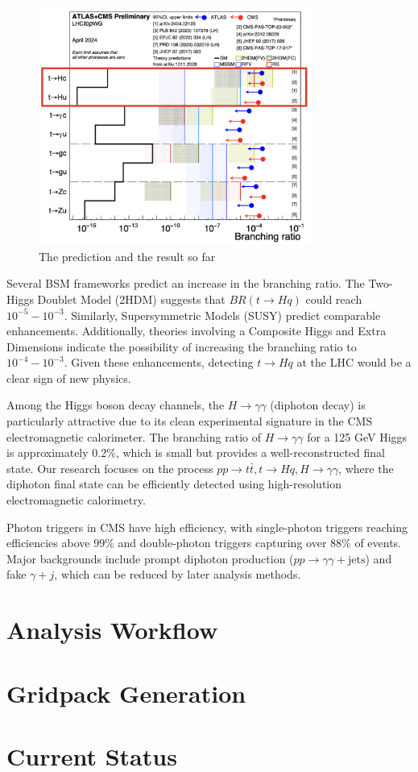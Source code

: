 \begin{figure}[htbp]
    \centering
    \includegraphics[width=0.8\textwidth]{Figures/topfcnc.png}
    \caption{The prediction and the result so far}
    \label{fig:TopFCNC}
\end{figure}

Several BSM frameworks predict an increase in the branching ratio. The Two-Higgs Doublet Model (2HDM) suggests that $BR(t \to Hq)$ could reach $10^{-5} - 10^{-3}$.\cite{noauthor_fcnchistory_nodate} Similarly, Supersymmetric Models (SUSY) predict comparable enhancements. Additionally, theories involving a Composite Higgs and Extra Dimensions indicate the possibility of increasing the branching ratio to $10^{-4} - 10^{-3}$. Given these enhancements, detecting $t \to Hq$ at the LHC would be a clear sign of new physics.

Among the Higgs boson decay channels, the $H \to \gamma\gamma$ (diphoton decay) is particularly attractive due to its clean experimental signature in the CMS electromagnetic calorimeter. The branching ratio of $H \to \gamma\gamma$ for a 125 GeV Higgs is approximately $0.2\%$, which is small but provides a well-reconstructed final state. Our research focuses on the process $pp \to t\bar{t}, t \to Hq, H \to \gamma\gamma$, where the diphoton final state can be efficiently detected using high-resolution electromagnetic calorimetry.

Photon triggers in CMS have high efficiency, with single-photon triggers reaching efficiencies above $99\%$ and double-photon triggers capturing over $88\%$ of events. Major backgrounds include prompt diphoton production ($pp \to \gamma\gamma + \text{jets}$) and fake $\gamma + j $, which can be reduced by later analysis methods.

\section{Analysis Workflow}
\section{Gridpack Generation}
\section{Current Status}